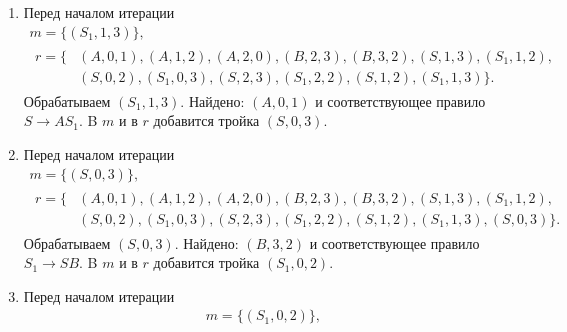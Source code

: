 \begin{example}
\begin{enumerate}
\begin{gather*}
                  \begin{aligned}
                      r = \{ & (A, 0, 1), (A, 1, 2), (A, 2, 0), (B, 2, 3), (B, 3, 2), (S, 1, 3), (S_1, 1, 2), \\
                             & (S, 0, 2), (S_1, 0, 3), (S, 2, 3), (S_1, 2, 2), (S, 1, 2)\}.
                  \end{aligned}
              \end{gather*}
              Обрабатываем $(S, 1, 2)$.
              Найдено: $(B, 2, 3)$ и соответствующее правило $S_1 \to S B$.
              B $m$ и в $r$ добавится тройка $(S_1, 1, 3)$.
        \item Перед началом итерации
              \begin{gather*}
                  m = \{(S_1, 1, 3)\},\\
                  \begin{aligned}
                      r = \{ & (A, 0, 1), (A, 1, 2), (A, 2, 0), (B, 2, 3), (B, 3, 2), (S, 1, 3), (S_1, 1, 2), \\
                             & (S, 0, 2), (S_1, 0, 3), (S, 2, 3), (S_1, 2, 2), (S, 1, 2), (S_1, 1, 3)\}.
                  \end{aligned}
              \end{gather*}
              Обрабатываем $(S_1, 1, 3)$.
              Найдено: $(A, 0, 1)$ и соответствующее правило $S \to A S_1$.
              B $m$ и в $r$ добавится тройка $(S, 0, 3)$.
        \item Перед началом итерации
              \begin{gather*}
                  m = \{(S, 0, 3)\}, \\
                  \begin{aligned}
                      r = \{ & (A, 0, 1), (A, 1, 2), (A, 2, 0), (B, 2, 3), (B, 3, 2), (S, 1, 3), (S_1, 1, 2),       \\
                             & (S, 0, 2), (S_1, 0, 3), (S, 2, 3), (S_1, 2, 2), (S, 1, 2), (S_1, 1, 3), (S, 0, 3)\}.
                  \end{aligned}
              \end{gather*}
              Обрабатываем $(S, 0, 3)$.
              Найдено: $(B, 3, 2)$ и соответствующее правило $S_1 \to S B$.
              B $m$ и в $r$ добавится тройка $(S_1, 0, 2)$.
        \item Перед началом итерации
              \begin{gather*}
                  m = \{(S_1, 0, 2)\}, \\

\end{gather*}
\end{enumerate}
\end{example}
